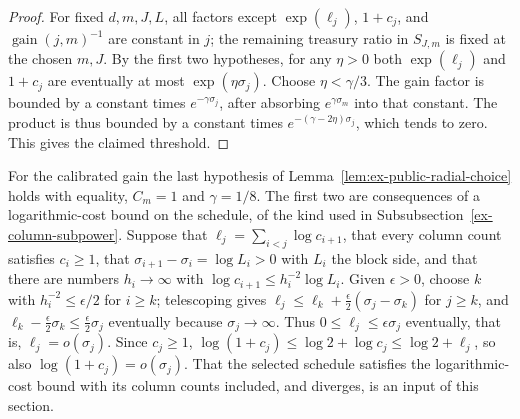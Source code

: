 \begin{proof}
For fixed $d,m,J,L$, all factors except $\exp(\ell_j)$,
$1+c_j$, and $\operatorname{gain}(j,m)^{-1}$ are constant in $j$; the
remaining treasury ratio in $S_{J,m}$ is fixed at the chosen $m,J$. By the
first two hypotheses, for any $\eta>0$ both $\exp(\ell_j)$ and $1+c_j$ are
eventually at most $\exp(\eta\sigma_j)$. Choose $\eta<\gamma/3$. The gain
factor is bounded by a constant times $e^{-\gamma\sigma_j}$, after absorbing
$e^{\gamma\sigma_m}$ into that constant. The product is thus bounded by a
constant times $e^{-(\gamma-2\eta)\sigma_j}$, which tends to zero. This gives
the claimed threshold.
\end{proof}

\begin{remark}
\label{rem:ex-public-radial-schedule}
For the calibrated gain the last hypothesis of
Lemma~\ref{lem:ex-public-radial-choice} holds with equality, $C_m=1$ and
$\gamma=1/8$. The first two are consequences of a logarithmic-cost bound on
the schedule, of the kind used in Subsubsection~\ref{ex-column-subpower}. Suppose
that $\ell_j=\sum_{i<j}\log c_{i+1}$, that every column count satisfies
$c_i\geq1$, that $\sigma_{i+1}-\sigma_i=\log L_i>0$ with $L_i$ the block side,
and that there are numbers $h_i\to\infty$ with
$\log c_{i+1}\leq h_i^{-2}\log L_i$. Given $\epsilon>0$, choose $k$ with
$h_i^{-2}\leq\epsilon/2$ for $i\geq k$; telescoping gives
$\ell_j\leq\ell_k+\tfrac\epsilon2(\sigma_j-\sigma_k)$ for $j\geq k$, and
$\ell_k-\tfrac\epsilon2\sigma_k\le\tfrac\epsilon2\sigma_j$ eventually because
$\sigma_j\to\infty$. Thus $0\leq\ell_j\leq\epsilon\sigma_j$ eventually, that is,
$\ell_j=o(\sigma_j)$. Since $c_j\geq1$,
$\log(1+c_j)\leq\log2+\log c_j\leq\log2+\ell_j$, so also
$\log(1+c_j)=o(\sigma_j)$. That the selected schedule satisfies the
logarithmic-cost bound with its column counts included, and diverges, is an
input of this section.
\end{remark}

